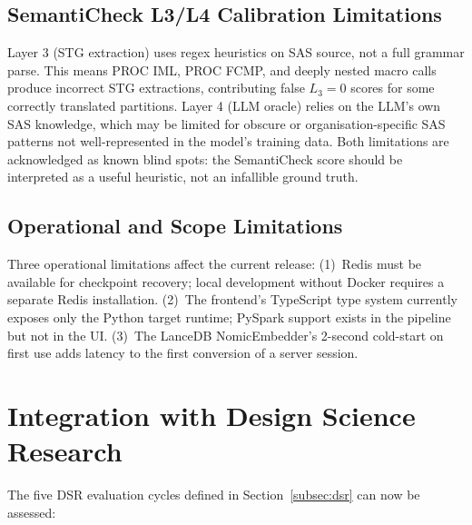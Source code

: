 \subsection{SemantiCheck L3/L4 Calibration Limitations}
\label{subsec:limit-sc-calibration}

Layer 3 (STG extraction) uses regex heuristics on SAS source, not a full grammar
parse. This means PROC IML, PROC FCMP, and deeply nested macro calls produce
incorrect STG extractions, contributing false $L_3 = 0$ scores for some
correctly translated partitions. Layer 4 (LLM oracle) relies on the LLM's
own SAS knowledge, which may be limited for obscure or organisation-specific
SAS patterns not well-represented in the model's training data. Both limitations
are acknowledged as known blind spots: the SemantiCheck score should be
interpreted as a useful heuristic, not an infallible ground truth.

\subsection{Operational and Scope Limitations}
\label{subsec:limit-operational}

Three operational limitations affect the current release:
(1)~Redis must be available for checkpoint recovery; local development
without Docker requires a separate Redis installation.
(2)~The frontend's TypeScript type system currently exposes only the Python
target runtime; PySpark support exists in the pipeline but not in the UI.
(3)~The LanceDB NomicEmbedder's 2-second cold-start on first use adds latency
to the first conversion of a server session.

\section{Integration with Design Science Research}
\label{sec:dsr-integration}

The five DSR evaluation cycles defined in
Section~\ref{subsec:dsr} can now be assessed:

